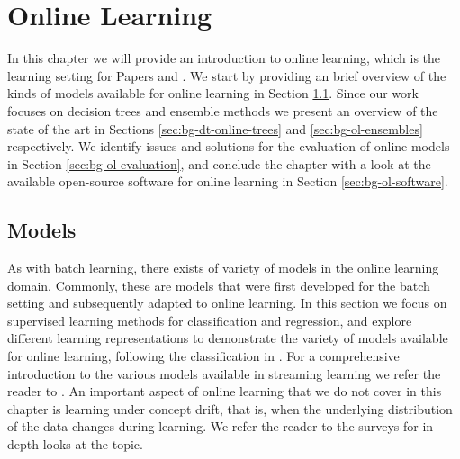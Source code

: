 \chapter{Online Learning}
\label{ch:bg-online-learning}

In this chapter we will provide an introduction to online learning, which is the learning
setting for Papers \boostvhtNum and \uncertaintreesNum. We start by providing an brief
overview of the kinds of models available for online learning in Section \ref{sec:bg-ol-models}.
Since our work focuses on decision trees and ensemble methods we present an overview of
the state of the art in Sections \ref{sec:bg-dt-online-trees} and \ref{sec:bg-ol-ensembles} respectively.
We identify issues and solutions for the evaluation of online models in Section \ref{sec:bg-ol-evaluation}, and conclude the chapter with a look at the available
open-source software for online learning in Section \ref{sec:bg-ol-software}.

\section{Models}
\label{sec:bg-ol-models}

As with batch learning, there exists of variety of models in the online
learning domain. Commonly, these are models that were first developed
for the batch setting and subsequently adapted to online learning.
In this section we focus on supervised learning methods for
classification and regression, and explore different
learning representations to demonstrate the variety of
models available for online learning, following the
classification in \cite{onlineML}. For a comprehensive
introduction to the various models available in streaming
learning we refer the reader to \cite{moa-book}.
An important aspect of online learning that we do not cover in this chapter is learning
under concept drift, that is, when the underlying distribution
of the data changes during learning. We refer the reader
to the surveys \cite{concept-drift-survey-indre, concept-drift-survey-gama}
for in-depth looks at the topic.

